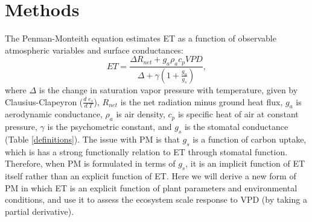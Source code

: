 \documentclass[12pt]{article}
\begin{document}
\section{Methods}
\label{methods}
The Penman-Monteith equation \cite<hereafter PM,>[]{Penman_1948,
  Monteith_1965} estimates ET as a function of observable atmospheric
variables and surface conductances:
  \begin{equation}
    \label{orig_pen}
    ET = \frac{\Delta R_{net} + g_a \rho_a c_p VPD}{\Delta + \gamma(1 + \frac{g_a}{g_s})},
  \end{equation}
  where $\Delta$ is the change in saturation vapor pressure with
  temperature, given by Clausius-Clapeyron
  ($\frac{d \; e_s}{d \; T}$), $R_{net}$ is the net radiation minus
  ground heat flux, $g_a$ is aerodynamic conductance, $\rho_a$ is air
  density, $c_p$ is specific heat of air at constant pressure,
  $\gamma$ is the psychometric constant, and $g_s$ is the stomatal
  conductance (Table \ref{definitions}). The issue with PM is that
  $g_s$ is a function of carbon uptake, which is has a strong
  functionally relation to ET through stomatal function. Therefore,
  when PM is formulated in terms of $g_s$, it is an implicit function
  of ET itself rather than an explicit function of ET. Here we will
  derive a new form of PM in which ET is an explicit function of plant
  parameters and environmental conditions, and use it to assess the
  ecosystem scale response to VPD (by taking a partial derivative).
\end{document}
